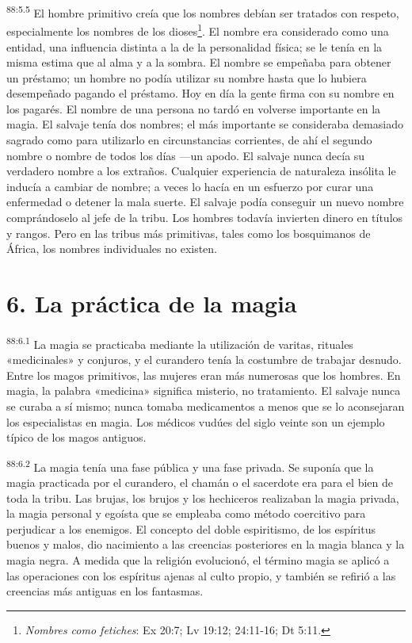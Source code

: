 \par
\textsuperscript{88:5.5} El hombre primitivo creía que los nombres debían ser tratados con respeto, especialmente los nombres de los dioses\footnote{\textit{Nombres como fetiches}: Ex 20:7; Lv 19:12; 24:11-16; Dt 5:11.}. El nombre era considerado como una entidad, una influencia distinta a la de la personalidad física; se le tenía en la misma estima que al alma y a la sombra. El nombre se empeñaba para obtener un préstamo; un hombre no podía utilizar su nombre hasta que lo hubiera desempeñado pagando el préstamo. Hoy en día la gente firma con su nombre en los pagarés. El nombre de una persona no tardó en volverse importante en la magia. El salvaje tenía dos nombres; el más importante se consideraba demasiado sagrado como para utilizarlo en circunstancias corrientes, de ahí el segundo nombre o nombre de todos los días ---un apodo. El salvaje nunca decía su verdadero nombre a los extraños. Cualquier experiencia de naturaleza insólita le inducía a cambiar de nombre; a veces lo hacía en un esfuerzo por curar una enfermedad o detener la mala suerte. El salvaje podía conseguir un nuevo nombre comprándoselo al jefe de la tribu. Los hombres todavía invierten dinero en títulos y rangos. Pero en las tribus más primitivas, tales como los bosquimanos de África, los nombres individuales no existen.

\section*{6. La práctica de la magia}
\par
\textsuperscript{88:6.1} La magia se practicaba mediante la utilización de varitas, rituales «medicinales» y conjuros, y el curandero tenía la costumbre de trabajar desnudo. Entre los magos primitivos, las mujeres eran más numerosas que los hombres. En magia, la palabra «medicina» significa misterio, no tratamiento. El salvaje nunca se curaba a sí mismo; nunca tomaba medicamentos a menos que se lo aconsejaran los especialistas en magia. Los médicos vudúes del siglo veinte son un ejemplo típico de los magos antiguos.

\par
\textsuperscript{88:6.2} La magia tenía una fase pública y una fase privada. Se suponía que la magia practicada por el curandero, el chamán o el sacerdote era para el bien de toda la tribu. Las brujas, los brujos y los hechiceros realizaban la magia privada, la magia personal y egoísta que se empleaba como método coercitivo para perjudicar a los enemigos. El concepto del doble espiritismo, de los espíritus buenos y malos, dio nacimiento a las creencias posteriores en la magia blanca y la magia negra. A medida que la religión evolucionó, el término magia se aplicó a las operaciones con los espíritus ajenas al culto propio, y también se refirió a las creencias más antiguas en los fantasmas.

